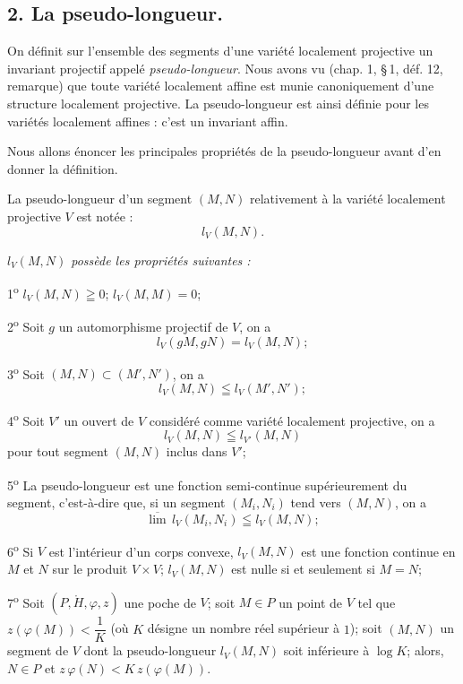 \documentclass[11pt]{article}
\newcommand{\bzcf}[2]{#1}
\newenvironment{enonce}{\par\medskip\noindent\itshape}{\par\medskip}
\begin{document}
\subsection*{2. La pseudo-longueur.}

On définit sur l'ensemble des segments d'une variété localement projective un invariant projectif
appelé \textit{pseudo-longueur}. Nous avons vu (\bzcf{chap. 1, \S\,1, déf. 12,
remarque}{\ref{bzrem:c1s1r1_affine_vers_projective}}) que toute variété localement affine est munie
canoniquement d'une structure localement projective. La pseudo-longueur est ainsi définie pour les
variétés localement affines : c'est un invariant affin.

Nous allons énoncer les principales propriétés de la pseudo-longueur avant d'en donner la
définition.

La pseudo-longueur d'un segment $(M, N)$ relativement à la variété localement projective $V$ est
notée :
\[ l_V(M, N). \]

\begin{enonce}
$l_V(M, N)$ possède les propriétés suivantes :

1\textsuperscript{o} \qquad $l_V(M, N)\geqq 0$; \qquad $l_V(M, M)=0$;

2\textsuperscript{o} Soit $g$ un automorphisme projectif de $V$, on a
\[ l_V(gM, gN)=l_V(M, N); \]

3\textsuperscript{o} Soit $(M, N)\subset(M', N')$, on a
\[ l_V(M, N)\leqq l_V(M', N'); \]

4\textsuperscript{o} Soit $V'$ un ouvert de $V$ considéré comme variété localement projective, on
a
\[ l_V(M, N)\leqq l_{V'}(M, N) \]
pour tout segment $(M, N)$ inclus dans $V'$;

5\textsuperscript{o} La pseudo-longueur est une fonction semi-continue supérieurement du segment,
c'est-à-dire que, si un segment $(M_i, N_i)$ tend vers $(M, N)$, on a
\[ \overline{\lim}\, l_V(M_i, N_i)\leqq l_V(M, N); \]

6\textsuperscript{o} Si $V$ est l'intérieur d'un corps convexe, $l_V(M, N)$ est une fonction
continue en $M$ et $N$ sur le produit $V\times V$; $l_V(M, N)$ est nulle si et seulement si
$M=N$;

7\textsuperscript{o} Soit $(P, \mathring{H}, \varphi, z)$ une poche de $V$; soit $M\in P$ un point
de $V$ tel que $z(\varphi(M))<\dfrac{1}{K}$ (où $K$ désigne un nombre réel supérieur à $1$); soit
$(M, N)$ un segment de $V$ dont la pseudo-longueur $l_V(M, N)$ soit inférieure à $\log K$; alors,
$N\in P$ et $z\,\varphi(N)<K\,z(\varphi(M))$.
\end{enonce}
\end{document}
